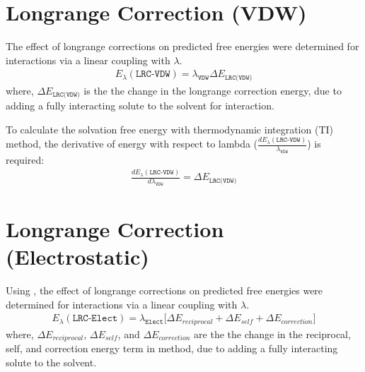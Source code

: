 \documentclass[letterpaper,10pt,english]{sphinxmanual}
\begin{document}
\section{Long\sphinxhyphen{}range Correction (VDW)}
\label{\detokenize{free_energy:long-range-correction-vdw}}
The effect of long\sphinxhyphen{}range corrections on predicted free energies were determined for  interactions via a linear coupling with \(\lambda\).
\begin{equation*}
\begin{split}E_{\lambda}(\texttt{LRC-VDW}) = \lambda_{\texttt{VDW}} \Delta E_{\texttt{LRC(VDW)}}\end{split}
\end{equation*}
where, \(\Delta E_{\texttt{LRC(VDW)}}\) is the the change in the long\sphinxhyphen{}range correction energy, due to adding a fully interacting solute
to the solvent for  interaction.

To calculate the solvation free energy with thermodynamic integration (TI) method, the derivative of energy with
respect to lambda (\(\frac{dE_{\lambda}(\texttt{LRC-VDW})}{\lambda_{\texttt{VDW}}}\)) is required:
\begin{equation*}
\begin{split}\frac{dE_{\lambda}(\texttt{LRC-VDW})}{d\lambda_{\texttt{VDW}}} = \Delta E_{\texttt{LRC(VDW)}}\end{split}
\end{equation*}

\section{Long\sphinxhyphen{}range Correction (Electrostatic)}
\label{\detokenize{free_energy:long-range-correction-electrostatic}}
Using , the effect of long\sphinxhyphen{}range corrections on predicted free energies were determined for  interactions
via a linear coupling with \(\lambda\).
\begin{equation*}
\begin{split}E_{\lambda}(\texttt{LRC-Elect}) = \lambda_{\texttt{Elect}} \bigg[\Delta E_{reciprocal} + \Delta E_{self} + \Delta E_{correction} \bigg]\end{split}
\end{equation*}
where, \(\Delta E_{reciprocal}\), \(\Delta E_{self}\), and \(\Delta E_{correction}\) are the the change in the reciprocal, self,
and correction energy term in  method, due to adding a fully interacting solute to the solvent.
\end{document}
